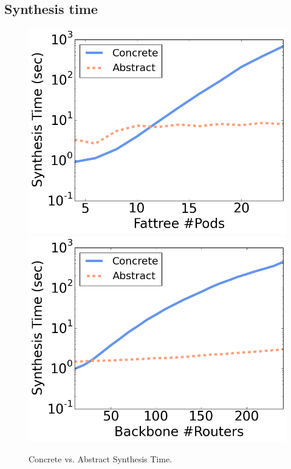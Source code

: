 \documentclass[numbers, 10pt, preprint]{sigplanconf}
\begin{document}
\subsection{Synthesis time}

\begin{figure}[t!]
    {\includegraphics[width=.49\columnwidth]{figures/Fattree-time.png}}
    {\includegraphics[width=.49\columnwidth]{figures/backbone-time.png}} \\
  \vspace{-.6em}
  \caption{Concrete vs. Abstract Synthesis Time. \label{fig:compilation-times}}
  \vspace{-1.2em}
\end{figure}
\end{document}

